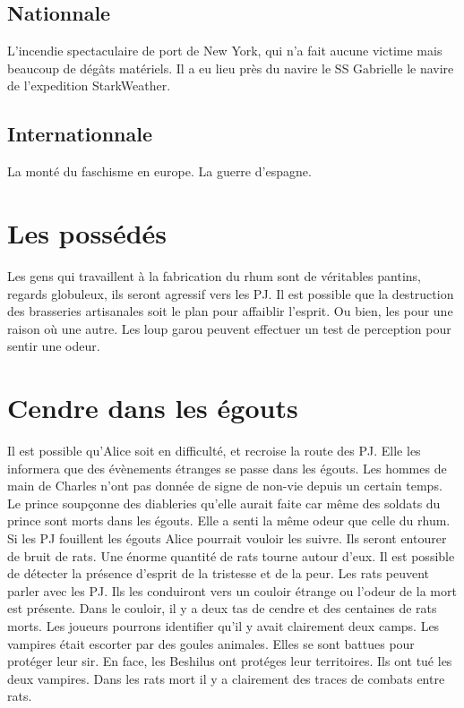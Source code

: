 \documentclass[oneside,12pt]{book}
\begin{document}
\begin{flushleft}
    \subsection{Nationnale}
        L'incendie spectaculaire de port de New York, qui n'a fait aucune victime mais beaucoup de dégâts matériels. Il a eu lieu près du navire le SS Gabrielle 
        le navire de l'expedition StarkWeather. 
    \subsection{Internationnale}
        La monté du faschisme en europe. La guerre d'espagne.

\section{Les possédés }
Les gens qui travaillent à la fabrication du rhum sont de véritables pantins, regards globuleux, ils seront agressif vers les PJ. 
Il est possible que la destruction des brasseries artisanales soit le plan pour affaiblir l'esprit. 
Ou bien, les pour une raison où une autre. 
Les loup garou peuvent effectuer un test de perception pour sentir une odeur.

\section{Cendre dans les égouts}
    Il est possible qu'Alice soit en difficulté, et recroise la route des PJ. 
Elle les informera que des évènements étranges se passe dans les égouts. 
Les hommes de main de Charles n'ont pas donnée de signe de non-vie depuis un certain temps. 
Le prince soupçonne des diableries qu'elle aurait faite car même des soldats du prince sont morts dans les égouts. 
Elle a senti la même odeur que celle du rhum. 
Si les PJ fouillent les égouts Alice pourrait vouloir les suivre. Ils seront entourer de bruit de rats. 
Une énorme quantité de rats tourne autour d'eux. Il est possible de détecter la présence d'esprit de la tristesse et de la peur.
Les rats peuvent parler avec les PJ. Ils les conduiront vers un couloir étrange ou l'odeur de la mort est présente. 
Dans le couloir, il y a deux tas de cendre et des centaines de rats morts. 
Les joueurs pourrons identifier qu'il y avait clairement deux camps.
Les vampires était escorter par des goules animales. Elles se sont battues pour protéger leur sir. 
En face, les Beshilus ont protéges leur territoires. Ils ont tué les deux vampires. Dans les rats mort il y a clairement des traces de 
combats entre rats.



\end{flushleft}
\end{document}
